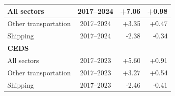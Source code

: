 \begin{table}[!h]
\begin{tabular}[t]{l|c|r|r}
\hspace{1em}All sectors & 2017--2024 & +7.06 & +0.98\\
\hline
\hspace{1em}Other transportation & 2017--2024 & +3.35 & +0.47\\
\hline
\hspace{1em}Shipping & 2017--2024 & -2.38 & -0.34\\
\hline
\multicolumn{4}{l}{\textbf{CEDS}}\\
\hline
\hspace{1em}All sectors & 2017--2023 & +5.60 & +0.91\\
\hline
\hspace{1em}Other transportation & 2017--2023 & +3.27 & +0.54\\
\hline
\hspace{1em}Shipping & 2017--2023 & -2.46 & -0.41\\
\hline
\end{tabular}
\end{table}
